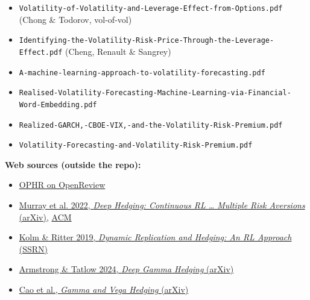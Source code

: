 \documentclass{article}
\begin{document}
\begin{itemize}

\item \texttt{Volatility-\allowbreak{}of-\allowbreak{}Volatility-\allowbreak{}and-\allowbreak{}Leverage-\allowbreak{}Effect-\allowbreak{}from-\allowbreak{}Options.\allowbreak{}pdf} (Chong \& Todorov, vol-of-vol)

\item \texttt{Identifying-\allowbreak{}the-\allowbreak{}Volatility-\allowbreak{}Risk-\allowbreak{}Price-\allowbreak{}Through-\allowbreak{}the-\allowbreak{}Leverage-\allowbreak{}Effect.\allowbreak{}pdf} (Cheng, Renault \& Sangrey)

\item \texttt{A-\allowbreak{}machine-\allowbreak{}learning-\allowbreak{}approach-\allowbreak{}to-\allowbreak{}volatility-\allowbreak{}forecasting.\allowbreak{}pdf}

\item \texttt{Realised-\allowbreak{}Volatility-\allowbreak{}Forecasting-\allowbreak{}Machine-\allowbreak{}Learning-\allowbreak{}via-\allowbreak{}Financial-\allowbreak{}Word-\allowbreak{}Embedding.\allowbreak{}pdf}

\item \texttt{Realized-\allowbreak{}GARCH,\allowbreak{}-\allowbreak{}CBOE-\allowbreak{}VIX,\allowbreak{}-\allowbreak{}and-\allowbreak{}the-\allowbreak{}Volatility-\allowbreak{}Risk-\allowbreak{}Premium.\allowbreak{}pdf}

\item \texttt{Volatility-\allowbreak{}Forecasting-\allowbreak{}and-\allowbreak{}Volatility-\allowbreak{}Risk-\allowbreak{}Premium.\allowbreak{}pdf}

\end{itemize}

\textbf{Web sources (outside the repo):}

\begin{itemize}

\item \href{https://openreview.net/pdf?id=2p4AtivyZz}{OPHR on OpenReview}

\item \href{https://arxiv.org/abs/2207.07467}{Murray et al. 2022, \emph{Deep Hedging: Continuous RL \ldots{} Multiple Risk Aversions} (arXiv)}, \href{https://dl.acm.org/doi/abs/10.1145/3533271.3561731}{ACM}

\item \href{https://papers.ssrn.com/sol3/papers.cfm?abstract_id=3281235}{Kolm \& Ritter 2019, \emph{Dynamic Replication and Hedging: An RL Approach} (SSRN)}

\item \href{https://arxiv.org/abs/2409.13567}{Armstrong \& Tatlow 2024, \emph{Deep Gamma Hedging} (arXiv)}

\item \href{https://arxiv.org/pdf/2205.05614}{Cao et al., \emph{Gamma and Vega Hedging} (arXiv)}

\end{itemize}
\end{document}
